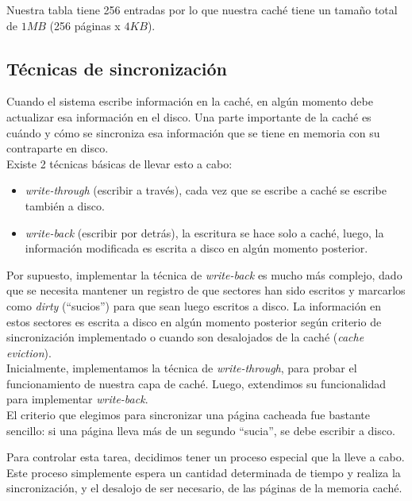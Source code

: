 \documentclass[a4paper,10pt]{article}
\begin{document}
Nuestra tabla tiene 256 entradas por lo que nuestra caché tiene un tamaño total de $1 MB$ (256 páginas x $4 KB$).\\

        \subsection{Técnicas de sincronización}

        Cuando el sistema escribe información en la caché, en algún momento debe actualizar esa información en el disco. Una parte importante de la caché es cuándo y
        cómo se sincroniza esa información que se tiene en memoria con su contraparte en disco. \\

        Existe 2 técnicas básicas de llevar esto a cabo:

        \begin{itemize}
        \item \textit{write-through} (escribir a través), cada vez que se escribe a caché se escribe también a disco.
        \item \textit{write-back} (escribir por detrás), la escritura se hace solo a caché, luego, la información modificada es escrita a disco en algún momento posterior.
        \end{itemize}

        Por supuesto, implementar la técnica de \textit{write-back} es mucho más complejo, dado que se necesita mantener un registro de que sectores han sido escritos y 
        marcarlos como \textit{dirty} (``sucios'') para que sean luego escritos a disco. La información en estos sectores es escrita a disco en algún momento posterior
        según criterio de sincronización implementado o cuando son desalojados de la caché (\textit{cache eviction}). \\

        Inicialmente, implementamos la técnica de \textit{write-through},  para probar el funcionamiento de nuestra capa de caché.
        Luego, extendimos su funcionalidad para implementar \textit{write-back}. \\

        El criterio que elegimos para sincronizar una página cacheada fue bastante sencillo: si una página lleva más de un segundo ``sucia'', se debe escribir a disco.
        
        Para controlar esta tarea, decidimos tener un proceso especial que la lleve a cabo. Este proceso simplemente espera un cantidad determinada de tiempo y realiza 
        la sincronización, y el desalojo de ser necesario, de las páginas de la memoria caché. 
\end{document}
